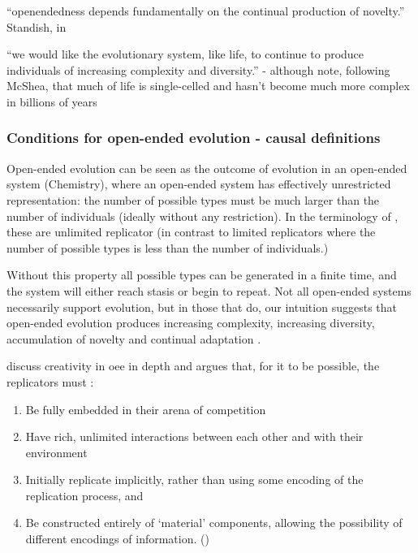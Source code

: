 ``openendedness depends fundamentally on the continual production of novelty.'' Standish, in \autocite{Soros2014}

``we would like the evolutionary system, like life, to continue to produce individuals of increasing complexity and diversity.'' -
although note, following McShea, that much of life is single-celled and hasn't become much more complex in billions of years \autocite{Maley1999}


\subsubsection{Conditions for open-ended evolution - causal definitions}

Open-ended evolution can be seen as the outcome of evolution in an open-ended system (\eg Chemistry), where an open-ended system has effectively unrestricted representation: the number of possible types must be much larger than the number of individuals (ideally without any restriction). In the terminology of \cite{Szathmary:2006ty}, these are unlimited replicator (in contrast to limited replicators where the number of possible types is less than the number of individuals.)

Without this property all possible types can be generated in a finite time, and the system will either reach stasis or begin to repeat. Not all open-ended systems necessarily support evolution, but in those that do, our intuition suggests that open-ended evolution produces increasing complexity, increasing diversity, accumulation of novelty and continual adaptation \cite{Lehman2012}.

\Textcite{Taylor2001,Taylor:1999sc} discuss creativity in \gls{oee} in depth and argues that, for it to be possible, the replicators must \parencite{Hutton2004}:
\begin{enumerate}[label=\roman*] 
	\item Be fully embedded in their arena of competition 
	\item Have rich, unlimited interactions between each other and with their environment 
	\item Initially replicate implicitly, rather than using some encoding of the replication process, and 
	\item Be constructed entirely of `material' components, allowing the possibility of different encodings of information. ()
\end{enumerate}

